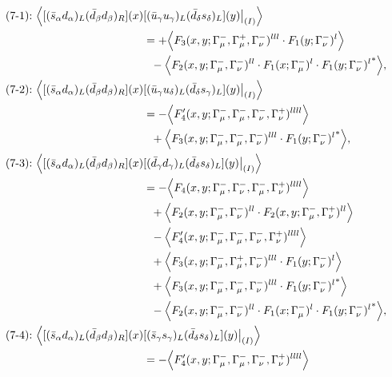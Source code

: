 \begin{align}
\\[3mm]
\mbox{(7-1):}\ 
\Big\langle
[(\bar s_\alpha d_\alpha)_L(\bar d_\beta d_\beta)_R](x)&
[(\bar u_\gamma u_\gamma)_L(\bar d_\delta s_\delta)_L](y)\big|_{(I)}
\Big\rangle
\notag\\*
&=
 + \Big\langle F_3(x,y;\Gamma_\mu^-,\Gamma_\mu^+,\Gamma_\nu^-)^{lll} \cdot F_1(y;\Gamma_\nu^-)^l\Big\rangle
\notag\\*&\ \ 
 - \Big\langle F_2(x,y;\Gamma_\mu^-,\Gamma_\nu^-)^{ll} \cdot F_1(x;\Gamma_\mu^-)^l \cdot {F_1(y;\Gamma_\nu^-)^l}^*\Big\rangle,
\\
\mbox{(7-2):}\ 
\Big\langle
[(\bar s_\alpha d_\alpha)_L(\bar d_\beta d_\beta)_R](x)&
[(\bar u_\gamma u_\delta)_L(\bar d_\delta s_\gamma)_L](y)\big|_{(I)}
\Big\rangle
\notag\\*
&=
 - \Big\langle F_4'(x,y;\Gamma_\mu^-,\Gamma_\mu^-,\Gamma_\nu^-,\Gamma_\nu^+)^{llll}\Big\rangle
\notag\\*&\ \ 
 + \Big\langle F_3(x,y;\Gamma_\mu^-,\Gamma_\mu^-,\Gamma_\nu^-)^{lll} \cdot {F_1(y;\Gamma_\nu^-)^l}^*\Big\rangle,
\\
\mbox{(7-3):}\ 
\Big\langle
[(\bar s_\alpha d_\alpha)_L(\bar d_\beta d_\beta)_R](x)&
[(\bar d_\gamma d_\gamma)_L(\bar d_\delta s_\delta)_L](y)\big|_{(I)}
\Big\rangle
\notag\\*
&=
 - \Big\langle F_4(x,y;\Gamma_\mu^-,\Gamma_\nu^-,\Gamma_\mu^-,\Gamma_\nu^+)^{llll}\Big\rangle
\notag\\*&\ \ 
 + \Big\langle F_2(x,y;\Gamma_\mu^-,\Gamma_\nu^-)^{ll} \cdot F_2(x,y;\Gamma_\mu^-,\Gamma_\nu^+)^{ll}\Big\rangle
\notag\\*&\ \ 
 - \Big\langle F_4'(x,y;\Gamma_\mu^-,\Gamma_\mu^-,\Gamma_\nu^-,\Gamma_\nu^+)^{llll}\Big\rangle
\notag\\*&\ \ 
 + \Big\langle F_3(x,y;\Gamma_\mu^-,\Gamma_\mu^+,\Gamma_\nu^-)^{lll} \cdot F_1(y;\Gamma_\nu^-)^l\Big\rangle
\notag\\*&\ \ 
 + \Big\langle F_3(x,y;\Gamma_\mu^-,\Gamma_\mu^-,\Gamma_\nu^-)^{lll} \cdot {F_1(y;\Gamma_\nu^-)^l}^*\Big\rangle
\notag\\*&\ \ 
 - \Big\langle F_2(x,y;\Gamma_\mu^-,\Gamma_\nu^-)^{ll} \cdot F_1(x;\Gamma_\mu^-)^l \cdot {F_1(y;\Gamma_\nu^-)^l}^*\Big\rangle,
\\
\mbox{(7-4):}\ 
\Big\langle
[(\bar s_\alpha d_\alpha)_L(\bar d_\beta d_\beta)_R](x)&
[(\bar s_\gamma s_\gamma)_L(\bar d_\delta s_\delta)_L](y)\big|_{(I)}
\Big\rangle
\notag\\*
&=
 - \Big\langle F_4'(x,y;\Gamma_\mu^-,\Gamma_\mu^-,\Gamma_\nu^-,\Gamma_\nu^+)^{llll}\Big\rangle

\end{align}
